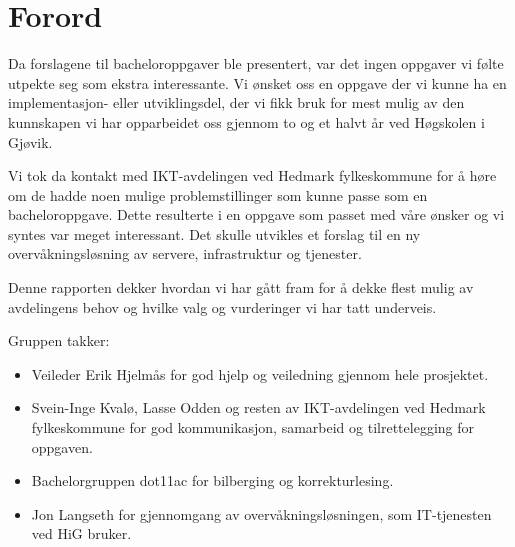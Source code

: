 \chapter*{Forord}
Da forslagene til bacheloroppgaver ble presentert, var det ingen oppgaver vi følte utpekte seg som ekstra interessante. Vi ønsket oss en oppgave der vi kunne ha en implementasjon- eller utviklingsdel, der vi fikk bruk for mest mulig av den kunnskapen vi har opparbeidet oss gjennom to og et halvt år ved Høgskolen i Gjøvik. 

Vi tok da kontakt med IKT-avdelingen ved Hedmark fylkeskommune for å høre om de hadde noen mulige problemstillinger som kunne passe som en bacheloroppgave. Dette resulterte i en oppgave som passet med våre ønsker og vi syntes var meget interessant. Det skulle utvikles et forslag til en ny overvåkningsløsning av servere, infrastruktur og tjenester. 

Denne rapporten dekker hvordan vi har gått fram for å dekke flest mulig av avdelingens behov og hvilke valg og vurderinger vi har tatt underveis.
 
Gruppen takker:
\begin{itemize} 
\item Veileder Erik Hjelmås for god hjelp og veiledning gjennom hele prosjektet.
\item Svein-Inge Kvalø, Lasse Odden og resten av IKT-avdelingen ved Hedmark fylkeskommune for god kommunikasjon, samarbeid og tilrettelegging for oppgaven.
\item Bachelorgruppen dot11ac for bilberging og korrekturlesing.
\item Jon Langseth for gjennomgang av overvåkningsløsningen, som IT-tjenesten ved HiG bruker.
\end{itemize}

